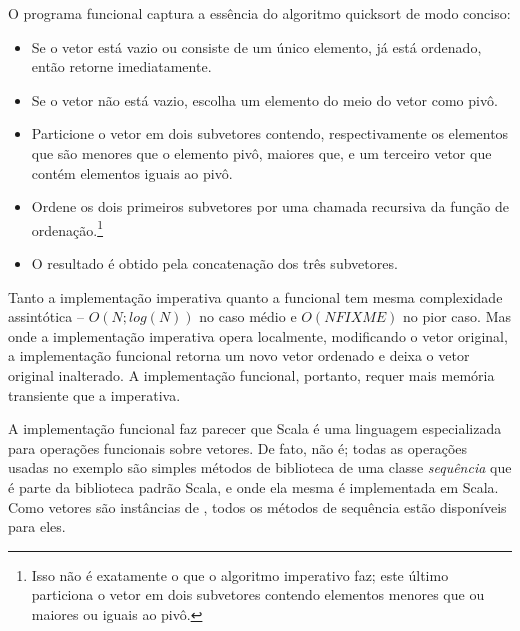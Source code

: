 O programa funcional captura a ess\^{e}ncia do algoritmo quicksort de modo conciso:
\begin{itemize}
\item Se o vetor est\'{a} vazio ou consiste de um \'{u}nico elemento, j\'{a} est\'{a} ordenado,
      ent\~{a}o retorne imediatamente.
\item Se o vetor n\~{a}o est\'{a} vazio, escolha um elemento do meio do vetor como piv\^{o}.
\item Particione o vetor em dois subvetores contendo, respectivamente os elementos
 que s\~{a}o menores que o elemento piv\^{o}, maiores que, e um terceiro vetor que cont\'{e}m
 elementos iguais ao piv\^{o}.
\item Ordene os dois primeiros subvetores por uma chamada recursiva da fun\c{c}\~{a}o de 
ordena\c{c}\~{a}o.\footnote{Isso n\~{a}o \'{e} exatamente o que o algoritmo imperativo faz; este 
\'{u}ltimo particiona o vetor em dois subvetores contendo elementos menores que ou 
maiores ou iguais ao piv\^{o}.}
\item O resultado \'{e} obtido pela concatena\c{c}\~{a}o dos tr\^{e}s subvetores.
\end{itemize}

Tanto a implementa\c{c}\~{a}o imperativa quanto a funcional tem mesma complexidade
assint\'{o}tica -- $O(N;log(N))$ no caso m\'{e}dio e $O(N FIXME)$ no pior caso. Mas onde
a implementa\c{c}\~{a}o imperativa opera localmente, modificando o vetor original,
a implementa\c{c}\~{a}o funcional retorna um novo vetor ordenado e deixa o vetor
original inalterado. A implementa\c{c}\~{a}o funcional, portanto, requer mais
mem\'{o}ria transiente que a imperativa.

A implementa\c{c}\~{a}o funcional faz parecer que Scala \'{e} uma linguagem
especializada para opera\c{c}\~{o}es funcionais sobre vetores. De fato, n\~{a}o \'{e};
todas as opera\c{c}\~{o}es usadas no exemplo s\~{a}o simples m\'{e}todos de biblioteca
de uma classe {\em sequ\^{e}ncia}  que \'{e} parte da biblioteca
padr\~{a}o Scala, e onde ela mesma \'{e} implementada em Scala. Como vetores s\~{a}o 
inst\^{a}ncias de \verb@Seq@, todos os m\'{e}todos de sequ\^{e}ncia est\~{a}o dispon\'{i}veis
para eles.

